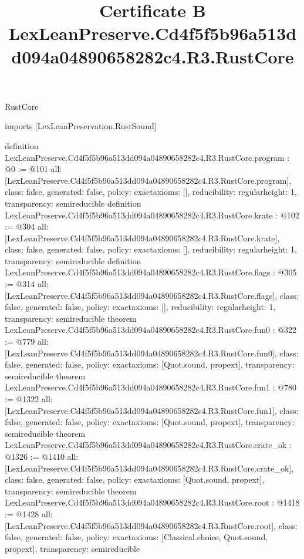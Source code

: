 \begin{lexlean}{RustCore}
\title{Certificate B LexLeanPreserve.Cd4f5f5b96a513dd094a04890658282c4.R3.RustCore}
\begin{coremodule}
imports [LexLeanPreservation.RustSound]

definition LexLeanPreserve.Cd4f5f5b96a513dd094a04890658282c4.R3.RustCore.program : @0 := @101 {
  all: [LexLeanPreserve.Cd4f5f5b96a513dd094a04890658282c4.R3.RustCore.program],
  class: false,
  generated: false,
  policy: exact{axioms: []},
  reducibility: regular{height: 1},
  transparency: semireducible
}
definition LexLeanPreserve.Cd4f5f5b96a513dd094a04890658282c4.R3.RustCore.krate : @102 := @304 {
  all: [LexLeanPreserve.Cd4f5f5b96a513dd094a04890658282c4.R3.RustCore.krate],
  class: false,
  generated: false,
  policy: exact{axioms: []},
  reducibility: regular{height: 1},
  transparency: semireducible
}
definition LexLeanPreserve.Cd4f5f5b96a513dd094a04890658282c4.R3.RustCore.flags : @305 := @314 {
  all: [LexLeanPreserve.Cd4f5f5b96a513dd094a04890658282c4.R3.RustCore.flags],
  class: false,
  generated: false,
  policy: exact{axioms: []},
  reducibility: regular{height: 1},
  transparency: semireducible
}
theorem LexLeanPreserve.Cd4f5f5b96a513dd094a04890658282c4.R3.RustCore.fun0 : @322 := @779 {
  all: [LexLeanPreserve.Cd4f5f5b96a513dd094a04890658282c4.R3.RustCore.fun0],
  class: false,
  generated: false,
  policy: exact{axioms: [Quot.sound, propext]},
  transparency: semireducible
}
theorem LexLeanPreserve.Cd4f5f5b96a513dd094a04890658282c4.R3.RustCore.fun1 : @780 := @1322 {
  all: [LexLeanPreserve.Cd4f5f5b96a513dd094a04890658282c4.R3.RustCore.fun1],
  class: false,
  generated: false,
  policy: exact{axioms: [Quot.sound, propext]},
  transparency: semireducible
}
theorem LexLeanPreserve.Cd4f5f5b96a513dd094a04890658282c4.R3.RustCore.crate_ok : @1326 := @1410 {
  all: [LexLeanPreserve.Cd4f5f5b96a513dd094a04890658282c4.R3.RustCore.crate_ok],
  class: false,
  generated: false,
  policy: exact{axioms: [Quot.sound, propext]},
  transparency: semireducible
}
theorem LexLeanPreserve.Cd4f5f5b96a513dd094a04890658282c4.R3.RustCore.root : @1418 := @1428 {
  all: [LexLeanPreserve.Cd4f5f5b96a513dd094a04890658282c4.R3.RustCore.root],
  class: false,
  generated: false,
  policy: exact{axioms: [Classical.choice, Quot.sound, propext]},
  transparency: semireducible
}


\end{coremodule}
\end{lexlean}
